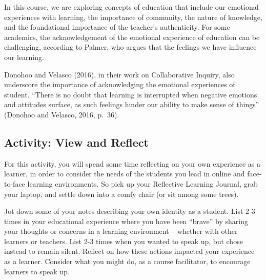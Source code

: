 \documentclass[
]{book}
\providecommand{\tightlist}{%
  \setlength{\itemsep}{0pt}\setlength{\parskip}{0pt}}
\begin{document}
In this course, we are exploring concepts of education that include our emotional experiences with learning, the importance of community, the nature of knowledge, and the foundational importance of the teacher's authenticity. For some academics, the acknowledgement of the emotional experience of education can be challenging, according to Palmer, who argues that the feelings we have influence our learning.

Donohoo and Velasco (2016), in their work on Collaborative Inquiry, also underscore the importance of acknowledging the emotional experiences of student. ``There is no doubt that learning is interrupted when negative emotions and attitudes surface, as such feelings hinder our ability to make sense of things'' (Donohoo and Velasco, 2016, p.~36).

\hypertarget{activity-view-and-reflect-1}{%
\subsection{Activity: View and Reflect}\label{activity-view-and-reflect-1}}

\begin{reflect}
For this activity, you will spend some time reflecting on your own
experience as a learner, in order to consider the needs of the students
you lead in online and face-to-face learning environments. So pick up
your Reflective Learning Journal, grab your laptop, and settle down into
a comfy chair (or sit among some trees).




Jot down some of your notes describing your own identity as a student.
List 2-3 times in your educational experience where you have been
``brave'' by sharing your thoughts or concerns in a learning environment
-- whether with other learners or teachers. List 2-3 times when you
wanted to speak up, but chose instead to remain silent. Reflect on how
these actions impacted your experience as a learner. Consider what you
might do, as a course facilitator, to encourage learners to speak up.
\end{reflect}
\end{document}

